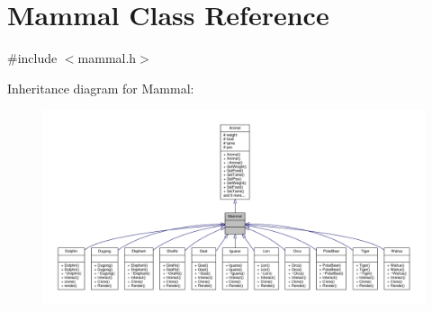 \hypertarget{classMammal}{}\section{Mammal Class Reference}
\label{classMammal}


{\ttfamily \#include $<$mammal.\+h$>$}



Inheritance diagram for Mammal\+:
\nopagebreak
\begin{figure}[H]
\begin{center}
\leavevmode
\includegraphics[width=350pt]{classMammal__inherit__graph}
\end{center}
\end{figure}


